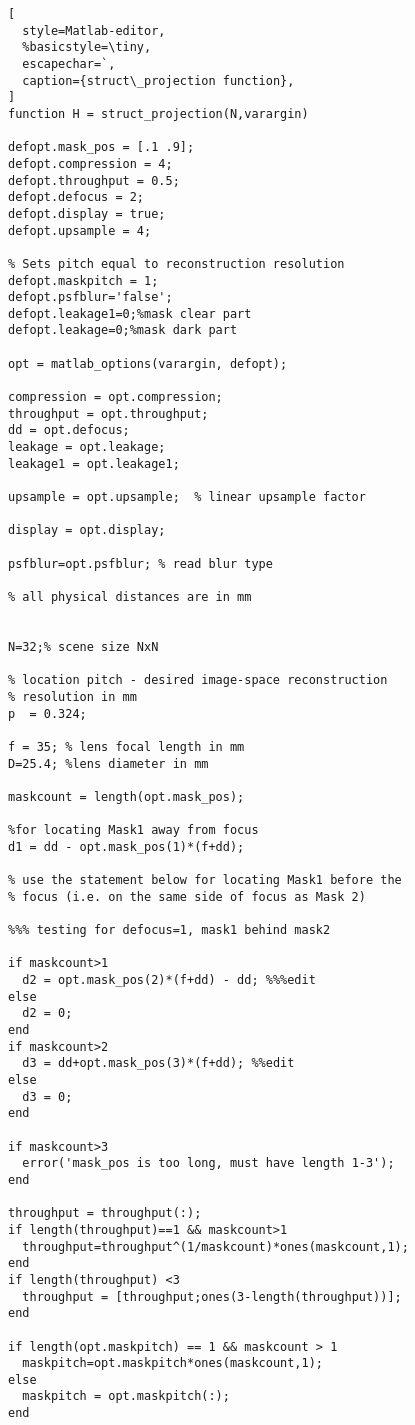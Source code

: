 \begin{lstlisting}[
  style=Matlab-editor,
  %basicstyle=\tiny,
  escapechar=`,
  caption={struct\_projection function},
]
function H = struct_projection(N,varargin)

defopt.mask_pos = [.1 .9];
defopt.compression = 4;
defopt.throughput = 0.5;
defopt.defocus = 2;
defopt.display = true;
defopt.upsample = 4;

% Sets pitch equal to reconstruction resolution
defopt.maskpitch = 1; 
defopt.psfblur='false';
defopt.leakage1=0;%mask clear part
defopt.leakage=0;%mask dark part

opt = matlab_options(varargin, defopt);

compression = opt.compression;
throughput = opt.throughput;
dd = opt.defocus;
leakage = opt.leakage;
leakage1 = opt.leakage1;

upsample = opt.upsample;  % linear upsample factor

display = opt.display;

psfblur=opt.psfblur; % read blur type

% all physical distances are in mm


N=32;% scene size NxN

% location pitch - desired image-space reconstruction 
% resolution in mm
p  = 0.324;  

f = 35; % lens focal length in mm
D=25.4; %lens diameter in mm

maskcount = length(opt.mask_pos);

%for locating Mask1 away from focus
d1 = dd - opt.mask_pos(1)*(f+dd); 

% use the statement below for locating Mask1 before the 
% focus (i.e. on the same side of focus as Mask 2)

%%% testing for defocus=1, mask1 behind mask2

if maskcount>1
  d2 = opt.mask_pos(2)*(f+dd) - dd; %%%edit
else
  d2 = 0;
end
if maskcount>2
  d3 = dd+opt.mask_pos(3)*(f+dd); %%edit
else
  d3 = 0;
end

if maskcount>3
  error('mask_pos is too long, must have length 1-3');
end

throughput = throughput(:);
if length(throughput)==1 && maskcount>1
  throughput=throughput^(1/maskcount)*ones(maskcount,1);
end
if length(throughput) <3
  throughput = [throughput;ones(3-length(throughput))];
end

if length(opt.maskpitch) == 1 && maskcount > 1
  maskpitch=opt.maskpitch*ones(maskcount,1);
else
  maskpitch = opt.maskpitch(:);
end


\end{lstlisting}
